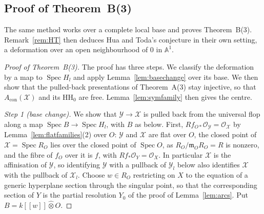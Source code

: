 \documentclass[11pt]{amsart}
\numberwithin{table}{section}
\numberwithin{figure}{section}
\numberwithin{equation}{section}
\theoremstyle{definition}
\theoremstyle{plain}
\newcommand{\Acon}{A_{\mathrm{con}}}
\newcommand{\cO}{\mathcal{O}}
\newcommand{\cX}{\mathcal{X}}
\newcommand{\cY}{\mathcal{Y}}
\newcommand{\HH}{\mathrm{HH}}
\newcommand{\A}{\mathbb{A}}
\DeclareMathOperator{\Spec}{Spec}
\begin{document}
\subsection{Proof of Theorem~B(3)}\label{ss:defflop}

The same method works over a complete local base and proves Theorem~B(3). Remark~\ref{rem:HT} then deduces Hua and Toda's conjecture in their own setting, a deformation over an open neighbourhood of $0$ in $\A^1$.

\begin{proof}[Proof of Theorem~B(3)]
The proof has three steps. We classify the deformation by a map to $\Spec H_l$ and apply Lemma~\ref{lem:basechange} over its base. We then show that the pulled-back presentations of Theorem~A(3) stay injective, so that $\Acon(\mathcal X)$ and its $\HH_0$ are free. Lemma~\ref{lem:symfamily} then gives the centre.

\emph{Step 1 (base change).} We show that $\mathcal Y \to \mathcal X$ is pulled back from the universal flop along a map $\Spec B \to \Spec H_l$, with $B$ as below. First, $Rf_{O*}\cO_{\mathcal Y} = \cO_{\mathcal X}$ by Lemma~\ref{lem:flatfamilies}(2) over $O$: $\mathcal Y$ and $\mathcal X$ are flat over $O$, the closed point of $\mathcal X = \Spec R_O$ lies over the closed point of $\Spec O$, as $R_O/\mathfrak m_OR_O = R$ is nonzero, and the fibre of $f_O$ over it is $f$, with $Rf_*\cO_Y = \cO_X$. In particular $\mathcal X$ is the affinisation of $\mathcal Y$, so identifying $\mathcal Y$ with a pullback of $\cY_l$ below also identifies $\mathcal X$ with the pullback of $\cX_l$. Choose $w \in R_O$ restricting on $X$ to the equation of a generic hyperplane section through the singular point, so that the corresponding section of $Y$ is the partial resolution $Y_0$ of the proof of Lemma~\ref{lem:arcs}. Put $B = k[[w]] \mathbin{\hat\otimes} O$.


\end{proof}
\end{document}
